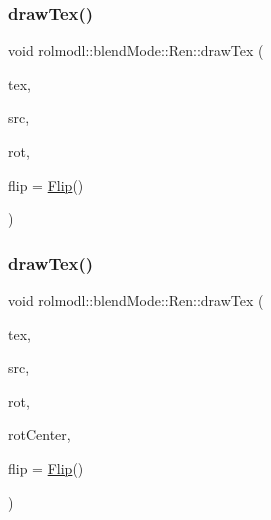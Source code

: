 \subsubsection{\texorpdfstring{drawTex()}{drawTex()}\hspace{0.1cm}{\footnotesize\ttfamily [16/36]}}
{\footnotesize\ttfamily void rolmodl\+::blend\+Mode\+::\+Ren\+::draw\+Tex (\begin{DoxyParamCaption}\item[{Tex \&}]{tex,  }\item[{const \mbox{\hyperlink{structrolmodl_1_1blend_mode_1_1_src_rect_x_y}{Src\+Rect\+XY}}}]{src,  }\item[{const double}]{rot,  }\item[{const \mbox{\hyperlink{structrolmodl_1_1blend_mode_1_1_flip}{Flip}}}]{flip = {\ttfamily \mbox{\hyperlink{structrolmodl_1_1blend_mode_1_1_flip}{Flip}}()} }\end{DoxyParamCaption})}

\mbox{\label{classrolmodl_1_1blend_mode_1_1_ren_a2edf12bf41e76d15e5103883dc4479ac}} 
\subsubsection{\texorpdfstring{drawTex()}{drawTex()}\hspace{0.1cm}{\footnotesize\ttfamily [17/36]}}
{\footnotesize\ttfamily void rolmodl\+::blend\+Mode\+::\+Ren\+::draw\+Tex (\begin{DoxyParamCaption}\item[{Tex \&}]{tex,  }\item[{const \mbox{\hyperlink{structrolmodl_1_1blend_mode_1_1_src_rect_w_h}{Src\+Rect\+WH}}}]{src,  }\item[{const double}]{rot,  }\item[{const \mbox{\hyperlink{structrolmodl_1_1geom_1_1_pos}{geom\+::\+Pos}}}]{rot\+Center,  }\item[{const \mbox{\hyperlink{structrolmodl_1_1blend_mode_1_1_flip}{Flip}}}]{flip = {\ttfamily \mbox{\hyperlink{structrolmodl_1_1blend_mode_1_1_flip}{Flip}}()} }\end{DoxyParamCaption})}

\mbox{\label{classrolmodl_1_1blend_mode_1_1_ren_a9cf698975c047f54f3fef379fe8d4c2e}} 

